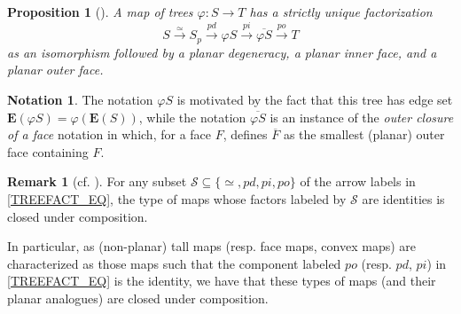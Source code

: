 \documentclass[a4paper,10pt
,draft
]{article}%
\numberwithin{equation}{section}
\numberwithin{figure}{section}
\newtheorem{proposition}[equation]{Proposition}%
\theoremstyle{definition} %
\newtheorem{remark}[equation]{Remark}%
\newtheorem{notation}[equation]{Notation}%
\newcommand{\1}{\ensuremath{\mathbbm 1}}%
\begin{document}
\begin{proposition}[{\cite[Prop. 2.2]{BP_edss}}]
      \label{TREEFACT_PROP}
      A map of trees $\varphi \colon S \to T$ %
      has a strictly unique factorization
      \begin{equation}\label{TREEFACT_EQ}
              S \xrightarrow{\simeq}
              S_p \xrightarrow{pd} 
              \varphi S \xrightarrow{pi} 
              \overline{\varphi S} \xrightarrow{po} T
      \end{equation}
      as an isomorphism followed by a planar degeneracy, a planar inner face, and a planar outer face.
\end{proposition}


\begin{notation}\label{TREEFACT NOT}
      The notation $\varphi S$ is motivated by the fact that this tree has edge set
      $\boldsymbol{E}(\varphi S) = \varphi (\boldsymbol{E}(S))$,
      while the 
      notation $\overline{\varphi S}$ is an instance of the 
      \emph{outer closure of a face}
      notation in \cite[Not. 2.14]{BP_edss}
      which, for a face $F$, defines $\overline{F}$
      as the smallest (planar) outer face containing $F$.
\end{notation}

\begin{remark}[{cf. \cite[Rems. \ref{TAS-TODF REM}, \ref{TAS-CNVXM REM}, \ref{TAS-TREEMAPCOMP_REM}]{BP_TAS}}]
        \label{TREEFACTNAMES_REM}
    For any subset
	$\mathcal{S} \subseteq \{\simeq,pd,pi,po\}$
	of the arrow labels 
	in \eqref{TREEFACT_EQ},
	the type of maps whose
	factors labeled by $\mathcal{S}$ are identities 
	is closed under composition.

        In particular, as (non-planar) tall maps (resp. face maps, convex maps) are characterized as those maps such that
        the component labeled $po$ (resp. $pd$, $pi$)
        in \eqref{TREEFACT_EQ}
        is the identity,
        we have that these types of maps (and their planar analogues) are closed under composition.
\end{remark}
\end{document}

